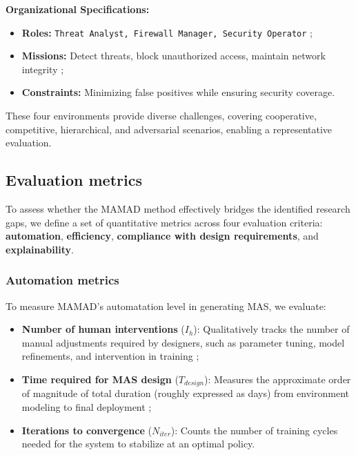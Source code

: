 \documentclass[pdflatex,sn-mathphys-num]{sn-jnl}%
\theoremstyle{thmstyleone}%
\theoremstyle{thmstyletwo}%
\theoremstyle{thmstylethree}%
\begin{document}
\textbf{Organizational Specifications:}
\begin{itemize}
    \item \textbf{Roles:} \texttt{Threat Analyst, Firewall Manager, Security Operator} ;
    \item \textbf{Missions:} Detect threats, block unauthorized access, maintain network integrity ;
    \item \textbf{Constraints:} Minimizing false positives while ensuring security coverage.
\end{itemize}

\bigskip

\noindent These four environments provide diverse challenges, covering cooperative, competitive, hierarchical, and adversarial scenarios, enabling a representative evaluation.


\subsection{Evaluation metrics}

To assess whether the MAMAD method effectively bridges the identified research gaps, we define a set of quantitative metrics across four evaluation criteria: \textbf{automation}, \textbf{efficiency}, \textbf{compliance with design requirements}, and \textbf{explainability}.

\subsubsection{Automation metrics}
To measure MAMAD's automatation level in generating MAS, we evaluate:
\begin{itemize}
    \item \textbf{Number of human interventions} ($I_h$): Qualitatively tracks the number of manual adjustments required by designers, such as parameter tuning, model refinements, and intervention in training ;
    \item \textbf{Time required for MAS design} ($T_{design}$): Measures the approximate order of magnitude of total duration (roughly expressed as days) from environment modeling to final deployment ;
    \item \textbf{Iterations to convergence} ($N_{iter}$): Counts the number of training cycles needed for the system to stabilize at an optimal policy.
\end{itemize}
\end{document}
